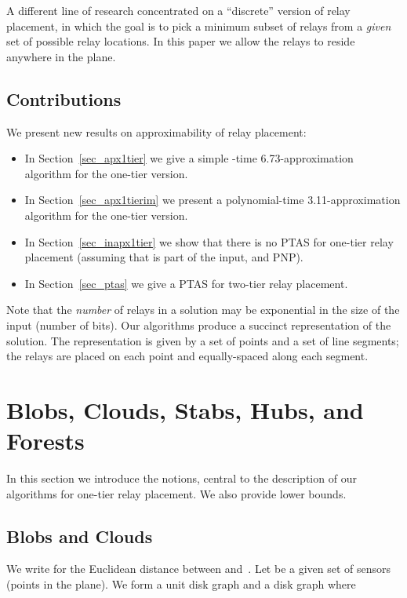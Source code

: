 \documentclass[11pt,a4paper]{article}
\theoremstyle{definition}
\theoremstyle{remark}
\begin{document}
A different line of research \cite{misra08constrained,carmi07covering} concentrated on a ``discrete'' version of relay placement, in which the goal is to pick a minimum subset of relays from a \emph{given} set of possible relay locations.  In this paper we allow the relays to reside anywhere in the plane.

\subsection{Contributions}

We present new results on approximability of relay placement:
\begin{itemize}[itemsep=0.5ex]
    \item In Section~\ref{sec_apx1tier} we give a simple -time 6.73-approximation algorithm for the one-tier version.
    \item In Section~\ref{sec_apx1tierim} we present a polynomial-time 3.11-approximation algorithm for the one-tier version.
    \item In Section~\ref{sec_inapx1tier} we show that there is no PTAS for one-tier relay placement (assuming that  is part of the input, and PNP).
    \item In Section~\ref{sec_ptas} we give a PTAS for two-tier relay placement.
\end{itemize}
Note that the \emph{number} of relays in a solution may be exponential in the size of the input (number of bits).  Our algorithms produce a succinct representation of the solution.  The representation is given by a set of points and a set of line segments; the relays are placed on each point and equally-spaced along each segment.



\section{Blobs, Clouds, Stabs, Hubs, and Forests}\label{sec_prelim}

In this section we introduce the notions, central to the description of our algorithms for one-tier relay placement.  We also provide lower bounds.

\subsection{Blobs and Clouds}

We write  for the Euclidean distance between  and~. Let  be a given set of sensors (points in the plane).  We form a unit disk graph  and a disk graph  where
\end{document}
